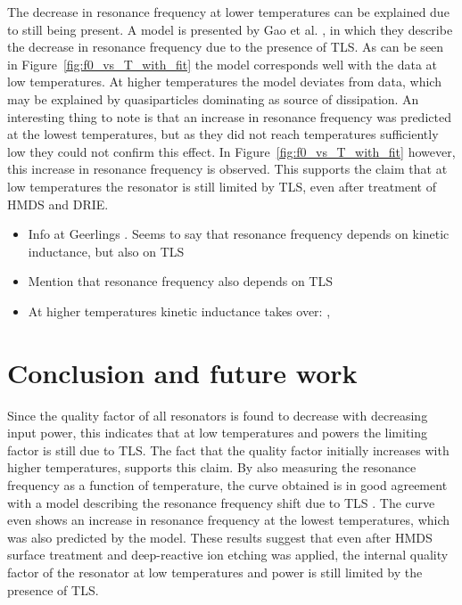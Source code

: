 \documentclass[12pt]{report}
\begin{document}
The decrease in resonance frequency at lower temperatures can be explained due to still being present. A model is presented by Gao et al. \cite{gao2008experimental}, in which they describe the decrease in resonance frequency due to the presence of TLS. As can be seen in Figure~\ref{fig:f0_vs_T_with_fit} the model corresponds well with the data at low temperatures. At higher temperatures the model deviates from data, which may be explained by quasiparticles dominating as source of dissipation. An interesting thing to note is that an increase in resonance frequency was predicted at the lowest temperatures, but as they did not reach temperatures sufficiently low they could not confirm this effect. In Figure~\ref{fig:f0_vs_T_with_fit} however, this increase in resonance frequency is observed. This supports the claim that at low temperatures the resonator is still limited by TLS, even after treatment of HMDS and DRIE.

\begin{itemize}
    \item Info at Geerlings \cite[p.~106]{Geerlings}. Seems to say that resonance frequency depends on kinetic inductance, but also on TLS
    \item Mention that resonance frequency also depends on TLS
    \item At higher temperatures kinetic inductance takes over: \cite{barends2008contribution}, \cite[ch.~3]{Gao}
\end{itemize}



\section{Conclusion and future work}

Since the quality factor of all resonators is found to decrease with decreasing input power, this indicates that at low temperatures and powers the limiting factor is still due to TLS. The fact that the quality factor initially increases with higher temperatures, supports this claim. By also measuring  the resonance frequency as a function of temperature, the curve obtained is in good agreement with a model describing the resonance frequency shift due to TLS \cite{gao2008experimental}. The curve even shows an increase in resonance frequency at the lowest temperatures, which was also predicted by the model. These results suggest that even after HMDS surface treatment and deep-reactive ion etching was applied, the internal quality factor of the resonator at low temperatures and power is still limited by the presence of TLS.
\end{document}

